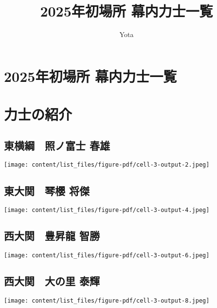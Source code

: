 \documentclass[
  letterpaper,
]{bxjsbook}
\title{2025年初場所 幕内力士一覧}
\author{Yota}
\date{}
\begin{document}
\maketitle



\chapter{2025年初場所
幕内力士一覧}\label{ux5e74ux521dux5834ux6240-ux5e55ux5185ux529bux58ebux4e00ux89a7}


\chapter{力士の紹介}\label{ux529bux58ebux306eux7d39ux4ecb}

\section{東横綱　照ノ富士
春雄}\label{ux6771ux6a2aux7db1-ux7167ux30ceux5bccux58eb-ux6625ux96c4}

\texttt{[image: content/list\_files/figure-pdf/cell-3-output-2.jpeg]}

\section{東大関　琴櫻
将傑}\label{ux6771ux5927ux95a2-ux7434ux6afb-ux5c06ux5091}

\texttt{[image: content/list\_files/figure-pdf/cell-3-output-4.jpeg]}

\section{西大関　豊昇龍
智勝}\label{ux897fux5927ux95a2-ux8c4aux6607ux9f8d-ux667aux52dd}

\texttt{[image: content/list\_files/figure-pdf/cell-3-output-6.jpeg]}

\section{西大関　大の里
泰輝}\label{ux897fux5927ux95a2-ux5927ux306eux91cc-ux6cf0ux8f1d}

\texttt{[image: content/list\_files/figure-pdf/cell-3-output-8.jpeg]}
\end{document}
